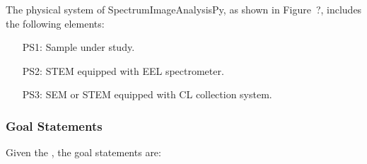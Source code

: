\documentclass[12pt]{article}
\newcommand{\progname}{SpectrumImageAnalysisPy} %
\begin{document}
The physical system of \progname{}, as shown in Figure~?,
includes the following elements:

\begin{itemize}

	\item[PS1:] Sample under study.
	\item[PS2:] STEM equipped with EEL spectrometer.
	\item[PS3:] SEM or STEM equipped with CL collection system.

%

\end{itemize}





\subsubsection{Goal Statements}

\noindent Given the , the goal statements are:
\end{document}
